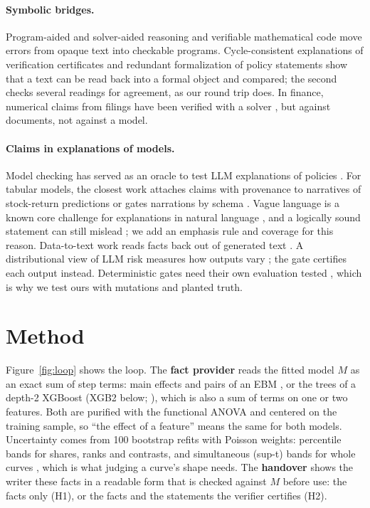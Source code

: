 \documentclass[11pt]{article}
\begin{document}
\paragraph{Symbolic bridges.} Program-aided and solver-aided reasoning \citep{gao2023pal,pan2023logiclm} and
verifiable mathematical code \citep{nezhad2025symcode} move errors from opaque text into checkable programs.
Cycle-consistent explanations of verification certificates \citep{rodriguez2026cycle} and redundant formalization of
policy statements \citep{an2025neurosymbolic} show that a text can be read back into a formal object and compared; the
second checks several readings for agreement, as our round trip does. In finance, numerical claims from filings have
been verified with a solver \citep{hall2026verifin}, but against documents, not against a model.

\paragraph{Claims in explanations of models.} Model checking has served as an oracle to test LLM explanations of
policies \citep{gross2026testing}. For tabular models, the closest work attaches claims with provenance to narratives
of stock-return predictions \citep{kim2026reasoning} or gates narrations by schema \citep{gupta2026veritygate}.
Vague language is a known core challenge for explanations in natural language \citep{reiter2019nlg}, and a logically
sound statement can still mislead \citep{chan2026logical}; we add an emphasis rule and coverage for this reason. Data-to-text
work reads facts back out of generated text \citep{wiseman2017challenges}. A distributional view of LLM risk measures
how outputs vary \citep{garcialorite2026distributional}; the gate certifies each output instead. Deterministic gates
need their own evaluation tested \citep{elina2026maat}, which is why we test ours with mutations and planted truth.

\section{Method}

Figure~\ref{fig:loop} shows the loop. The \textbf{fact provider} reads the fitted model $M$ as an exact sum of step
terms: main effects and pairs of an EBM \citep{lou2013ga2m,nori2019interpretml}, or the trees of a depth-2 XGBoost
(XGB2 below; \citealp{chen2016xgboost}), which is also a sum of terms on one or two features. Both are purified with
the functional ANOVA \citep{lengerich2020purifying} and centered on the training sample, so ``the effect of a feature'' means the
same for both models. Uncertainty comes from 100 bootstrap refits with Poisson weights: percentile bands for shares,
ranks and contrasts, and simultaneous (sup-t) bands for whole curves \citep{montielolea2019simultaneous}, which is
what judging a curve's shape needs. The \textbf{handover} shows the writer these facts in a readable form that is
checked against $M$ before use: the facts only (H1), or the facts and the statements the verifier certifies (H2).
\end{document}
